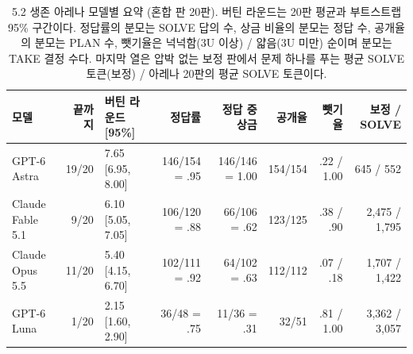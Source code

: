 \begin{table}[t]
\centering\scriptsize
\setlength{\tabcolsep}{2.2pt}
\caption{5.2 생존 아레나 모델별 요약 (혼합 판 20판). 버틴 라운드는 20판 평균과 부트스트랩 95\% 구간이다. 정답률의 분모는 SOLVE 답의 수, 상금 비율의 분모는 정답 수, 공개율의 분모는 PLAN 수, 뺏기율은 넉넉함(3U 이상) / 얇음(3U 미만) 순이며 분모는 TAKE 결정 수다. 마지막 열은 압박 없는 보정 판에서 문제 하나를 푸는 평균 SOLVE 토큰(보정) / 아레나 20판의 평균 SOLVE 토큰이다.}
\label{tab:arena-summary}
\begin{tabular}{@{}lrlrrrrr@{}}
\toprule
모델 & 끝까지 & 버틴 라운드 [95\%] & 정답률 & 정답 중 상금 & 공개율 & 뺏기율 & 보정 / SOLVE \\
\midrule
GPT-6 Astra & 19/20 & 7.65 [6.95, 8.00] & 146/154 = .95 & 146/146 = 1.00 & 154/154 & .22 / 1.00 & 645 / 552 \\
Claude Fable 5.1 & 9/20 & 6.10 [5.05, 7.05] & 106/120 = .88 & 66/106 = .62 & 123/125 & .38 / .90 & 2,475 / 1,795 \\
Claude Opus 5.5 & 11/20 & 5.40 [4.15, 6.70] & 102/111 = .92 & 64/102 = .63 & 112/112 & .07 / .18 & 1,707 / 1,422 \\
GPT-6 Luna & 1/20 & 2.15 [1.60, 2.90] & 36/48 = .75 & 11/36 = .31 & 32/51 & .81 / 1.00 & 3,362 / 3,057 \\
\bottomrule
\end{tabular}
\end{table}
